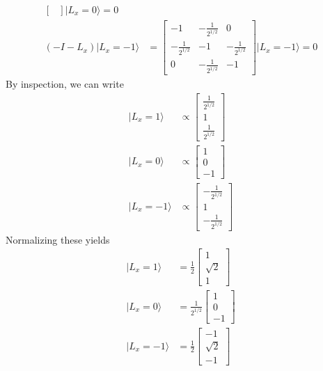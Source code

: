 \documentclass[../principles-of-quantum-mechanics.tex]{subfiles}
\begin{document}
\begin{questions}
\begin{solution}
\begin{parts}
\begin{align*}
\begin{bmatrix}
				\end{bmatrix}|L_x = 0\rangle = 0 \\
				({-I} - L_x)|L_x = {-1}\rangle &= \begin{bmatrix}
					{-1} & -\frac{1}{2^{1/2}} & 0 \\ -\frac{1}{2^{1/2}} & {-1} & -\frac{1}{2^{1/2}} \\ 0 & -\frac{1}{2^{1/2}} & {-1}
				\end{bmatrix}|L_x = {-1}\rangle = 0
			\end{align*}
			By inspection, we can write
			\begin{align*}
				|L_x=1\rangle &\propto \begin{bmatrix}\frac{1}{2^{1/2}} \\ 1 \\ \frac{1}{2^{1/2}}\end{bmatrix} \\
				|L_x=0\rangle &\propto \begin{bmatrix}1 \\ 0 \\ {-1}\end{bmatrix} \\
				|L_x={-1}\rangle &\propto \begin{bmatrix}{-\frac{1}{2^{1/2}}} \\ 1 \\ -\frac{1}{2^{1/2}}\end{bmatrix}
			\end{align*}
			Normalizing these yields
			\begin{align*}
				|L_x=1\rangle &= \frac{1}{2}\!\!\begin{bmatrix}1 \\ \sqrt{2} \\ 1\end{bmatrix} \\
				|L_x=0\rangle &= \frac{1}{2^{1/2}}\!\!\begin{bmatrix}1 \\ 0 \\ {-1}\end{bmatrix} \\
				|L_x={-1}\rangle &= \frac{1}{2}\begin{bmatrix}{-1} \\ \sqrt{2} \\ {-1}\end{bmatrix}
			\end{align*}

\end{parts}
\end{solution}
\end{questions}
\end{document}
